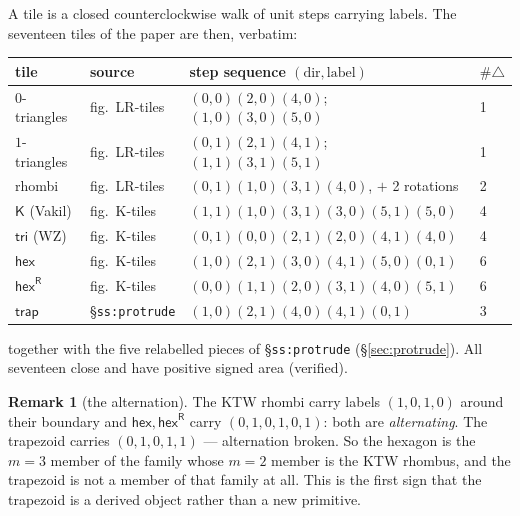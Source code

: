 \documentclass[11pt]{article}
\theoremstyle{definition}
\newtheorem{remark}[theorem]{Remark}
\newcommand{\hex}{\mathsf{hex}}
\newcommand{\hexR}{\mathsf{hex}^{\mathsf{R}}}
\newcommand{\trap}{\mathsf{trap}}
\newcommand{\Ktile}{\mathsf{K}}
\newcommand{\tritile}{\mathsf{tri}}
\begin{document}
A tile is a closed counterclockwise walk of unit steps carrying labels. The
seventeen tiles of the paper are then, verbatim:

\begin{center}\small
\begin{tabular}{llll}
\hline
tile & source & step sequence $(\text{dir},\text{label})$ & $\#\triangle$\\
\hline
$0$-triangles & fig.~LR-tiles & $(0,0)(2,0)(4,0)$;\ $(1,0)(3,0)(5,0)$ & 1\\
$1$-triangles & fig.~LR-tiles & $(0,1)(2,1)(4,1)$;\ $(1,1)(3,1)(5,1)$ & 1\\
rhombi & fig.~LR-tiles & $(0,1)(1,0)(3,1)(4,0)$, $+$ 2 rotations & 2\\
$\Ktile$ (Vakil) & fig.~K-tiles & $(1,1)(1,0)(3,1)(3,0)(5,1)(5,0)$ & 4\\
$\tritile$ (WZ) & fig.~K-tiles & $(0,1)(0,0)(2,1)(2,0)(4,1)(4,0)$ & 4\\
$\hex$ & fig.~K-tiles & $(1,0)(2,1)(3,0)(4,1)(5,0)(0,1)$ & 6\\
$\hexR$ & fig.~K-tiles & $(0,0)(1,1)(2,0)(3,1)(4,0)(5,1)$ & 6\\
$\trap$ & \S\texttt{ss:protrude} & $(1,0)(2,1)(4,0)(4,1)(0,1)$ & 3\\
\hline
\end{tabular}
\end{center}

\noindent together with the five relabelled pieces of \S\texttt{ss:protrude}
(\S\ref{sec:protrude}). All seventeen close and have positive signed area
(verified).

\begin{remark}[the alternation]
The KTW rhombi carry labels $(1,0,1,0)$ around their boundary and $\hex,\hexR$
carry $(0,1,0,1,0,1)$: both are \emph{alternating}. The trapezoid carries
$(0,1,0,1,1)$ --- alternation broken. So the hexagon is the $m=3$ member of the
family whose $m=2$ member is the KTW rhombus, and the trapezoid is not a member
of that family at all. This is the first sign that the trapezoid is a derived
object rather than a new primitive.
\end{remark}
\end{document}
